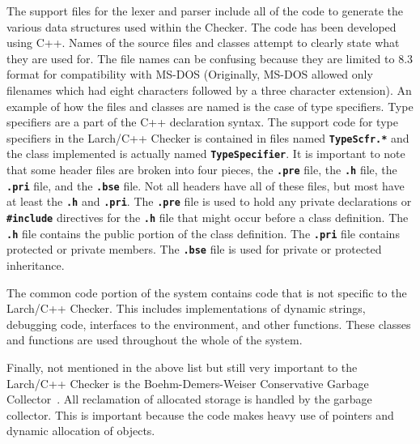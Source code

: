 \documentclass[12pt]{article} %
\newcommand{\reserved}[1]{\textbf{\texttt{#1}}} %
\begin{document}
The support files for the lexer and parser include all of the code to
generate the various data structures used within the Checker. The code
has been developed using C++. Names of the source files and classes
attempt to clearly state what they are used for. The file names can be
confusing because they are limited to 8.3 format for compatibility
with MS-DOS (Originally, MS-DOS allowed only filenames which had eight 
characters followed by a three character extension). An example of how the files and classes are named is the
case of type specifiers. Type specifiers are a part of the C++
declaration syntax. The support code for type specifiers in the
Larch/C++ Checker is contained in files named \reserved{TypeScfr.*}
and the class implemented is actually named \reserved{TypeSpecifier}. It is
important to note that some header files are broken into four
pieces, the \reserved{.pre} file, the \reserved{.h} file, the
\reserved{.pri} file, and the \reserved{.bse} file. Not all headers
have all of these files, but most have at least the \reserved{.h} and
\reserved{.pri}. The \reserved{.pre} file is used to hold any
private declarations or \reserved{\#include} directives for the
\reserved{.h} file that might occur before a class definition. The
\reserved{.h} file contains the public portion of the class definition. The
\reserved{.pri} file contains protected or private members. The
\reserved{.bse} file is used for private or protected inheritance.

The common code portion of the system contains code that is not
specific to the Larch/C++ Checker. This includes implementations of
dynamic strings, debugging code, interfaces to the environment, and
other functions. These classes and functions are used throughout the
whole of the system.

Finally, not mentioned in the above list but still very important to
the Larch/C++ Checker is the Boehm-Demers-Weiser Conservative Garbage
Collector~\cite{Boehm-Weiser88}. All reclamation of allocated storage
is handled by the garbage collector. This is important because the
code makes heavy use of pointers and dynamic allocation of objects.
\end{document}
